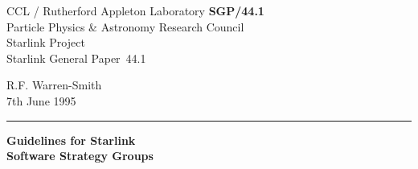 \documentclass[twoside,11pt]{article}
\newcommand{\stardoccategory}  {Starlink General Paper}
\newcommand{\stardocinitials}  {SGP}
\newcommand{\stardocnumber}    {44.1}
\newcommand{\stardocauthors}   {R.F. Warren-Smith}
\newcommand{\stardocdate}      {7th June 1995}
\newcommand{\stardoctitle}     {Guidelines for Starlink\\
                                Software Strategy Groups}
\newcommand{\stardocname}{\stardocinitials /\stardocnumber}
\newenvironment{latexonly}{}{}
\begin{document}
\thispagestyle{empty}

\begin{latexonly}
   CCL / {\sc Rutherford Appleton Laboratory} \hfill {\bf \stardocname}\\
   {\large Particle Physics \& Astronomy Research Council}\\
   {\large Starlink Project\\}
   {\large \stardoccategory\ \stardocnumber}
   \begin{flushright}
   \stardocauthors\\
   \stardocdate
   \end{flushright}
   \vspace{-4mm}
   \rule{\textwidth}{0.5mm}
   \vspace{5mm}
   \begin{center}
   {\Large\bf \stardoctitle}
   \end{center}
   \vspace{5mm}

\end{latexonly}
\end{document}
